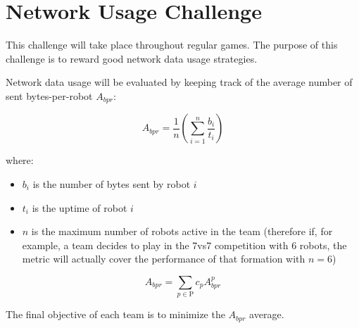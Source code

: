 \section{Network Usage Challenge} %
This challenge will take place throughout regular games. The purpose of this challenge is to reward good network data usage strategies.

Network data usage will be evaluated by keeping track of the average number of sent bytes-per-robot $A_{bpr}$:

$$ A_{bpr} = \frac{1}{n} \left( \sum_{i=1}^n \frac{b_i}{t_i} \right) $$

where:
\begin{itemize}
    \item $b_i$ is the number of bytes sent by robot $i$
    \item $t_i$ is the uptime of robot $i$
    \item $n$ is the maximum number of robots active in the team (therefore if, for example, a team decides to play in the 7vs7 competition with 6 robots, the metric will actually cover the performance of that formation with $n=6$)
\end{itemize}



$$ A_{bpr} = \sum_{p \in \text{P}} c_p A^p_{bpr} $$



The final objective of each team is to minimize the $A_{bpr}$ average.
